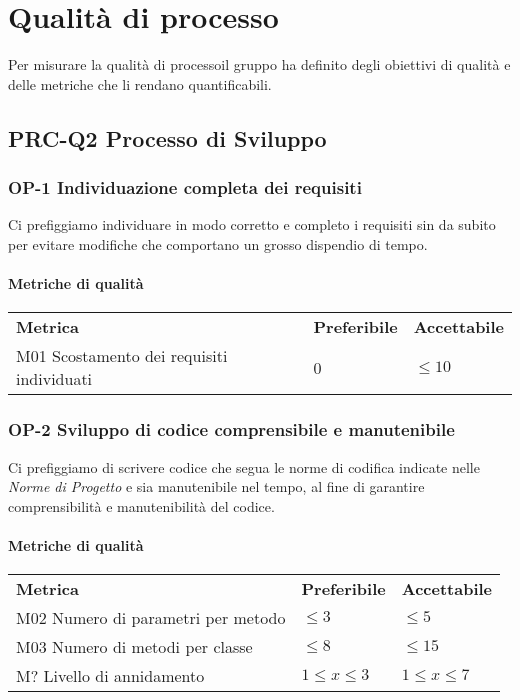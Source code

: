 \section{Qualità di processo}
Per misurare la qualità di processo\glosp il gruppo ha definito degli obiettivi di qualità e delle metriche che li rendano quantificabili.
	\subsection{PRC-Q2 Processo di Sviluppo}
		\subsubsection{OP-1 Individuazione completa dei requisiti} 
			Ci prefiggiamo individuare in modo corretto e completo i requisiti sin da subito per evitare modifiche che comportano un grosso dispendio di tempo.
			\paragraph{Metriche di qualità} \mbox{}
			\begin{longtable} {
					>{}p{80mm} 
					>{}p{25mm}
					>{}p{25mm}
				}
				\rowcolor{gray!50}
				\textbf{Metrica} & \textbf{Preferibile} & \textbf{Accettabile} \TBstrut \TBstrut \\
				M01 Scostamento dei requisiti individuati & 0 & $\le 10$ \TBstrut \\ [2mm]
			\end{longtable}
			
		\subsubsection{OP-2 Sviluppo di codice comprensibile e manutenibile}
			Ci prefiggiamo di scrivere codice che segua le norme di codifica indicate nelle \textit{Norme di Progetto} e sia manutenibile nel tempo, al fine di garantire comprensibilità e manutenibilità del codice.
			\paragraph{Metriche di qualità} \mbox{}
			\begin{longtable} {
					>{}p{80mm} 
					>{}p{25mm}
					>{}p{25mm}
				}
				\rowcolor{gray!50}
				\textbf{Metrica} & \textbf{Preferibile} & \textbf{Accettabile} \TBstrut \TBstrut \\
				M02 Numero di parametri per metodo & $ \le 3$ & $ \le 5$ \TBstrut \\ [2mm]
				M03 Numero di metodi per classe & $ \le 8$ & $ \le 15$ \TBstrut \\ [2mm]
				M? Livello di annidamento & $1 \le x \le 3$ & $1 \le x \le 7$ \TBstrut \\ [2mm]
			\end{longtable}
	
